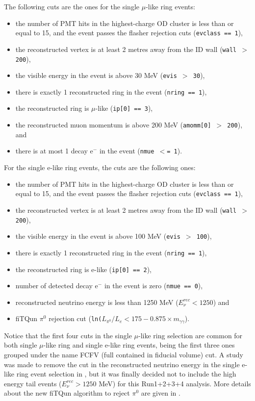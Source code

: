 The following cuts are the ones for the single $\mu$-like ring events:

\begin{itemize}
\item
the number of PMT hits in the highest-charge OD cluster is less than or
equal to 15, and the event passes the flasher rejection cuts
({\tt evclass == 1}),
\item
the reconstructed vertex is at least 2 metres away from the ID wall 
({\tt wall $>$ 200}),
\item
the visible energy in the event is above 30 MeV 
({\tt evis  $>$ 30}),
\item
there is exactly 1 reconstructed ring in the event 
({\tt nring == 1}),
\item
the reconstructed ring is $\mu$-like 
({\tt ip[0] == 3}),
\item
the reconstructed muon momentum is above 200 MeV 
({\tt amomm[0] $>$ 200}), and
\item
there is at most 1 decay e$^{-}$ in the event 
({\tt nmue $<$= 1}).
\end{itemize}

For the single e-like ring events, the cuts are the following ones:

\begin{itemize}
\item
the number of PMT hits in the highest-charge OD cluster is less than or
equal to 15, and the event passes the flasher rejection cuts
({\tt evclass == 1}),
\item
the reconstructed vertex is at least 2 metres away from the ID wall 
({\tt wall $>$ 200}),
\item
the visible energy in the event is above 100 MeV 
({\tt evis  $>$ 100}),
\item
there is exactly 1 reconstructed ring in the event 
({\tt nring == 1}),
\item
the reconstructed ring is e-like 
({\tt ip[0] == 2}),
\item
number of detected decay e$^{-}$ in the event is zero
({\tt nmue == 0}), 
\item
reconstructed neutrino energy is less than 1250 MeV
({\tt $E^{rec}_{\nu} < 1250$}) and
\item
fiTQun $\pi^{0}$ rejection cut
({\tt ln($L_{\pi^{0}}/L_{e}<175-0.875\times m_{\gamma\gamma}$}).

\end{itemize}

Notice that the first four cuts in the single $\mu$-like ring selection are common for
both single $\mu$-like ring and single e-like ring events, being the first three ones
grouped under the name FCFV (full contained in fiducial volume) cut. 
A study was made to remove the cut in the reconstructed neutrino energy in the single e-like ring event
selection in \cite{2013nuenergy}, but it was finally decided not to include the high energy tail events ($E^{rec}_{\nu}>1250$ MeV) for this Run1+2+3+4 analysis. More details about the new fiTQun algorithm to reject $\pi^{0}$ are given in \cite{fiTQun}.




